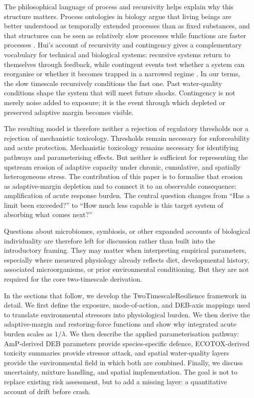 	The philosophical language of process and recursivity helps explain why this structure matters. Process ontologies in biology argue that living beings are better understood as temporally extended processes than as fixed substances, and that structures can be seen as relatively slow processes while functions are faster processes \citep{dupre2015process}. Hui's account of recursivity and contingency gives a complementary vocabulary for technical and biological systems: recursive systems return to themselves through feedback, while contingent events test whether a system can reorganise or whether it becomes trapped in a narrowed regime \citep{hui2019recursivity}. In our terms, the slow timescale recursively conditions the fast one. Past water-quality conditions shape the system that will meet future shocks. Contingency is not merely noise added to exposure; it is the event through which depleted or preserved adaptive margin becomes visible.
	
	The resulting model is therefore neither a rejection of regulatory thresholds nor a rejection of mechanistic toxicology. Thresholds remain necessary for enforceability and acute protection. Mechanistic toxicology remains necessary for identifying pathways and parameterising effects. But neither is sufficient for representing the upstream erosion of adaptive capacity under chronic, cumulative, and spatially heterogeneous stress. The contribution of this paper is to formalise that erosion as adaptive-margin depletion and to connect it to an observable consequence: amplification of acute response burden. The central question changes from ``Has a limit been exceeded?'' to ``How much less capable is this target system of absorbing what comes next?''
	
	Questions about microbiomes, symbiosis, or other expanded accounts of biological individuality are therefore left for discussion rather than built into the introductory framing. They may matter when interpreting empirical parameters, especially where measured physiology already reflects diet, developmental history, associated microorganisms, or prior environmental conditioning. But they are not required for the core two-timescale derivation.
	
	In the sections that follow, we develop the TwoTimescaleResilience framework in detail. We first define the exposure, mode-of-action, and DEB-axis mappings used to translate environmental stressors into physiological burden. We then derive the adaptive-margin and restoring-force functions and show why integrated acute burden scales as $1/\lambda$. We then describe the applied parameterisation pathway: AmP-derived DEB parameters provide species-specific defence, ECOTOX-derived toxicity summaries provide stressor attack, and spatial water-quality layers provide the environmental field in which both are combined. Finally, we discuss uncertainty, mixture handling, and spatial implementation. The goal is not to replace existing risk assessment, but to add a missing layer: a quantitative account of drift before crash.
	
